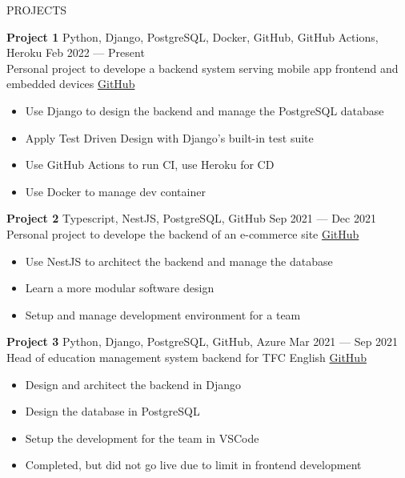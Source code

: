 \documentclass{resume} %
\begin{document}
\begin{rSection}{PROJECTS}
  \vspace{-1.25em}
  \item \textbf{Project 1} {Python, Django, PostgreSQL, Docker, GitHub, GitHub Actions, Heroku} \hfill Feb 2022 --- Present \\
  Personal project to develope a backend system serving mobile app frontend and embedded devices \hfill \href{https://github.com/Smithienious/CO3109-Backend}{GitHub}
  \begin{itemize}
    \item Use Django to design the backend and manage the PostgreSQL database
    \item Apply Test Driven Design with Django's built-in test suite
    \item Use GitHub Actions to run CI, use Heroku for CD
    \item Use Docker to manage dev container
  \end{itemize}
  \item \textbf{Project 2} {Typescript, NestJS, PostgreSQL, GitHub} \hfill Sep 2021 --- Dec 2021 \\
  Personal project to develope the backend of an e-commerce site \hfill \href{https://github.com/Smithienious/CO3103-Proj}{GitHub}
  \begin{itemize}
    \item Use NestJS to architect the backend and manage the database
    \item Learn a more modular software design
    \item Setup and manage development environment for a team
  \end{itemize}
  \item \textbf{Project 3} {Python, Django, PostgreSQL, GitHub, Azure} \hfill Mar 2021 --- Sep 2021 \\
  Head of education management system backend for TFC English \hfill \href{https://github.com/Smithienious/tfc-backend}{GitHub}
  \begin{itemize}
    \item Design and architect the backend in Django
    \item Design the database in PostgreSQL
    \item Setup the development for the team in VSCode
    \item Completed, but did not go live due to limit in frontend development

\end{itemize}
\end{rSection}
\end{document}
